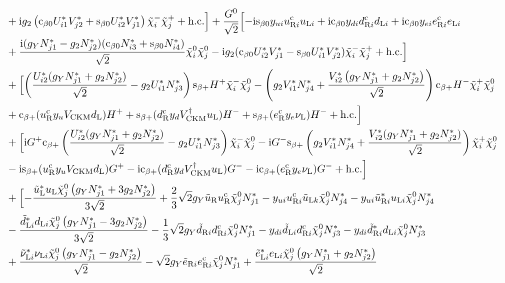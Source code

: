 \documentclass[CheatSheet]{subfiles}
\begin{document}
\begin{equation}
\begin{split}
\\&
+{}\ii g_2  \left(\co{\beta0} U_{i1}^* V_{j2}^*+\si{\beta0} U_{i2}^* V_{j1}^*\right) {\charM[i]\charP[j]}
+\text{h.c.}
\Bigr]
+
\frac{ G^0}{\sqrt2}\Bigl[
  - \ii\si{\beta0} \yu[i]\uR[i]^{\cc}\uL[i]
  + \ii\co{\beta0} \yd[i]\dR[i]^{\cc}\dL[i]
  + \ii\co{\beta0} \ye[i]\eR[i]^{\cc }\eL[i]
  \\&
  +\frac{\ii(g_Y N_{j1}^*-g_2 N_{j2}^*)(\co{\beta0} N_{i3}^*+\si{\beta0} N_{i4}^*)}{\sqrt2} {\neut[i]\neut[j]}
  -\ii g_2 (\co{\beta0} U_{i2}^* V_{j1}^*-\si{\beta0} U_{i1}^* V_{j2}^*){\charM[i]\charP[j]}
  +\text{h.c.}
\Bigr]
\\&
+\Bigl[
    \left(\frac{U_{i2}^* (g_Y N_{j1}^*+g_2 N_{j2}^*)}{\sqrt{2}}-g_2  U_{i1}^* N_{j3}^*\right)  \si{\beta+}{H^{+}\charM[i]\neut[j]}
  - \left(g_2 V_{i1}^* N_{j4}^*+\frac{V_{i2}^* \left(g_Y N_{j1}^*+g_2 N_{j2}^*\right)}{\sqrt2}\right)\co{\beta+} {H^{-}\charP[i]\neut[j]}
  \\&
  + \co{\beta+} (\uR^{\cc}\yu V\w{CKM} \dL)H^+
  + \si{\beta+} (\dR^{\cc}\yd V\w{CKM}^\dagger \uL)H^-
  + \si{\beta+} (\eR^{\cc}\ye\nuL)H^-
+\text{h.c.}
\Bigr]
\\&+
\Bigl[
    \ii G^+\co{\beta+}  \left(\frac{U_{i2}^* (g_Y N_{j1}^*+g_2 N_{j2}^*)}{\sqrt2}-g_2 U_{i1}^* N_{j3}^*\right)  {\charM[i]\neut[j]}
  - \ii G^-\si{\beta+} \left(g_2 V_{i1}^* N_{j4}^*+\frac{V_{i2}^* (g_Y N_{j1}^*+g_2 N_{j2}^*)}{\sqrt{2}}\right) \charP[i]\neut[j]
  \\&
  - \ii \si{\beta+} (\uR^{\cc}\yu V\w{CKM} \dL)G^+
  - \ii \co{\beta+} (\dR^{\cc}\yd V\w{CKM}^\dagger \uL)G^-
  - \ii \co{\beta+} (\eR^{\cc}\ye\nuL)G^-
  + \text{h.c.}
\Bigr]
\\&
+\Bigl[
  -\frac{{\tuL^{*}\uL\neut[j]} \left(g_Y N_{j1}^*+3 g_2 N_{j2}^*\right)}{3 \sqrt{2}}
  +\frac{2}{3} \sqrt{2} g_Y {\tuR\uR^{\cc}\neut[j]} N_{j1}^*
  -{\yu[i]\uR[i]^{\cc}\tuL[k]\neut[j]} N_{j4}^*
  -{\yu[i]\tuR[i]^{*}\uL[i]\neut[j]} N_{j4}^*
  \\&
  -\frac{{\tdL[i]^{*}\dL[i]\neut[j]} \left(g_Y N_{j1}^*-3 g_2 N_{j2}^*\right)}{3 \sqrt{2}}
  -\frac{1}{3} \sqrt{2} g_Y {\tdR[i]\dR[i]^{\cc}\neut[j]} N_{j1}^*
  -{\yd[i]\tdL[i]\dR[i]^{\cc}\neut[j]} N_{j3}^*
  -{\yd[i]\tdR[i]^{*}\dL[i]\neut[j]} N_{j3}^*
  \\&
  +\frac{{\tnuL[i]^{*}\nuL[i]\neut[j]} \left(g_Y N_{j1}^*-g_2 N_{j2}^*\right)}{\sqrt{2}}
  -\sqrt{2} g_Y {\teR[i]\eR[i]^{\cc }\neut[j]} N_{j1}^*
  +\frac{{\teL[i]^{*}\eL[i]\neut[j]} \left(g_Y N_{j1}^*+g_2 N_{j2}^*\right)}{\sqrt{2}}
  \\&

\end{split}
\end{equation}
\end{document}
